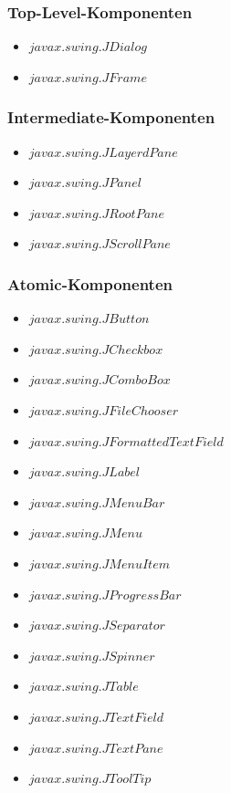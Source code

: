   \subsubsection{Top-Level-Komponenten}
  
  \begin{itemize}
    \item \(javax.swing.JDialog\)
    \item \(javax.swing.JFrame\)
  \end{itemize}
  
  \subsubsection{Intermediate-Komponenten}
  
  \begin{itemize}
    \item \(javax.swing.JLayerdPane\)
    \item \(javax.swing.JPanel\)
    \item \(javax.swing.JRootPane\)
    \item \(javax.swing.JScrollPane\)
  \end{itemize}
  
  \subsubsection{Atomic-Komponenten}
  
  \begin{itemize}
    \item \(javax.swing.JButton\)
    \item \(javax.swing.JCheckbox\)
    \item \(javax.swing.JComboBox\)
    \item \(javax.swing.JFileChooser\)
    \item \(javax.swing.JFormattedTextField\)
    \item \(javax.swing.JLabel\)
    \item \(javax.swing.JMenuBar\)
    \item \(javax.swing.JMenu\)
    \item \(javax.swing.JMenuItem\)
    \item \(javax.swing.JProgressBar\)
    \item \(javax.swing.JSeparator\)
    \item \(javax.swing.JSpinner\)
    \item \(javax.swing.JTable\)
    \item \(javax.swing.JTextField\)
    \item \(javax.swing.JTextPane\)
    \item \(javax.swing.JToolTip\)
  \end{itemize}
  
